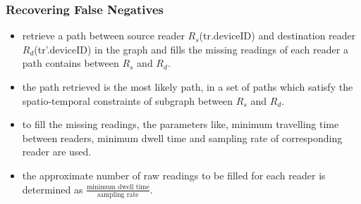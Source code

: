 
\begin{frame}
\frametitle{Recovering False Negatives}

\begin{itemize}

  \item retrieve a path between source reader $R_s$(tr.deviceID) and destination reader $R_d$(tr'.deviceID) in the graph and fills the missing readings of each reader a path contains between $R_s$ and $R_d$.

  \item the path retrieved is the most likely path, in a set of paths which satisfy the spatio-temporal constraints of subgraph between $R_s$ and $R_d$.

  \item to fill the missing readings, the parameters like, minimum travelling time between readers, minimum dwell time and sampling rate of corresponding reader are used.

  \item the approximate number of raw readings to be filled for each reader is determined as $\frac{\text{minimum dwell time}}{\text{sampling rate}}$.

\end{itemize}

\end{frame}


